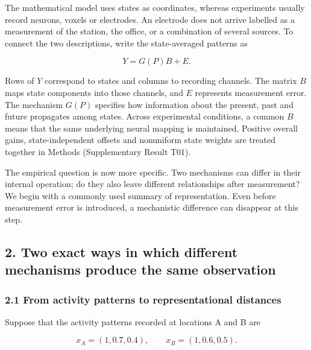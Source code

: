 \documentclass[11pt,a4paper]{article}
\begin{document}
\par
\noindent\begin{minipage}{\linewidth}

The mathematical model uses states as coordinates, whereas experiments
usually record neurons, voxels or electrodes. An electrode does not
arrive labelled as a measurement of the station, the office, or a
combination of several sources. To connect the two descriptions, write
the state-averaged patterns as

\[
Y=G(P)B+E.
\]

\end{minipage}\par

Rows of \(Y\) correspond to states and columns to recording channels.
The matrix \(B\) maps state components into those channels, and \(E\)
represents measurement error. The mechanism \(G(P)\) specifies how
information about the present, past and future propagates among states.
Across experimental conditions, a common \(B\) means that the same
underlying neural mapping is maintained. Positive overall gains,
state-independent offsets and nonuniform state weights are treated
together in Methods (Supplementary Result T01).

The empirical question is now more specific. Two mechanisms can differ
in their internal operation; do they also leave different relationships
after measurement? We begin with a commonly used summary of
representation. Even before measurement error is introduced, a
mechanistic difference can disappear at this step.

\subsection{2. Two exact ways in which different mechanisms produce the
same
observation}\label{two-exact-ways-in-which-different-mechanisms-produce-the-same-observation}

\subsubsection{2.1 From activity patterns to representational
distances}\label{from-activity-patterns-to-representational-distances}

\par
\noindent\begin{minipage}{\linewidth}

Suppose that the activity patterns recorded at locations A and B are

\[
x_A=(1,0.7,0.4),\qquad x_B=(1,0.6,0.5).
\]

\end{minipage}\par
\end{document}
